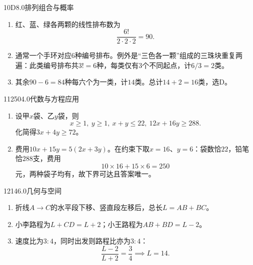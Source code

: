 \begin{solution}{10}{D}{8.0}{排列组合与概率}
\begin{enumerate}[label=\textbf{Step \arabic*:},leftmargin=*]
  \item 红、蓝、绿各两颗的线性排布数为
  \[
    \frac{6!}{2\cdot2\cdot2}=90.
  \]
  \item 通常一个手环对应\(6\)种编号排布。例外是“三色各一颗”组成的三珠块重复两遍：此类编号排布共\(3!=6\)种，每类仅有\(3\)个不同起点，计\(6/3=2\)类。
  \item 其余\(90-6=84\)种每六个为一类，计\(14\)类。总计\(14+2=16\)类，选D。
\end{enumerate}
\end{solution}


\begin{solution}{11}{250}{4.0}{代数与方程应用}
\begin{enumerate}[label=\textbf{Step \arabic*:},leftmargin=*]
  \item 设甲\(x\)袋、乙\(y\)袋，则
  \[
    x\ge1,\ y\ge1,\ x+y\le22,\ 12x+16y\ge288.
  \]
  化简得\(3x+4y\ge72\)。
  \item 费用\(10x+15y=5(2x+3y)\)。在约束下取\(x=16\)、\(y=6\)：袋数恰\(22\)，铅笔恰\(288\)支，费用
  \[
    10\times16+15\times6=250
  \]
  元，两种袋子均有，故下界可达且答案唯一。
\end{enumerate}
\end{solution}

\begin{solution}{12}{14}{6.0}{几何与空间}
\begin{enumerate}[label=\textbf{Step \arabic*:},leftmargin=*]
  \item 折线\(A\to C\)的水平段下移、竖直段左移后，总长\(L=AB+BC\)。
  \item 小李路程为\(L+CD=L+2\)；小王路程为\(AB+BD=L-2\)。
  \item 速度比为\(3:4\)，同时出发则路程比亦为\(3:4\)：
  \[
    \frac{L-2}{L+2}=\frac{3}{4}\implies L=14.
  \]
\end{enumerate}
\end{solution}

